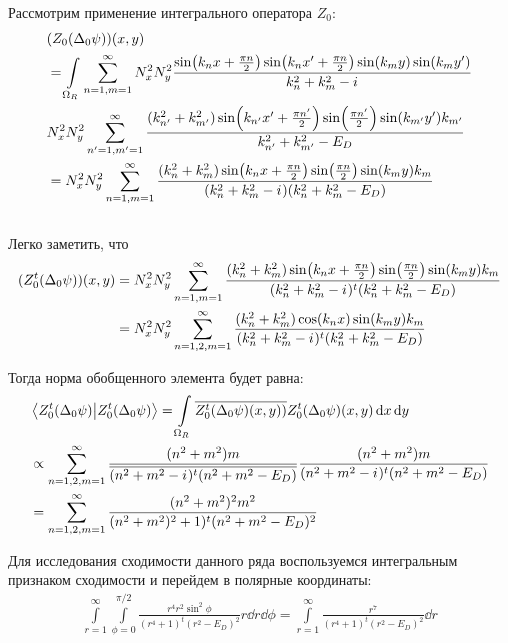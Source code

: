 Рассмотрим применение интегрального оператора $Z_0$:
\begin{align*}
& (Z_0 (\Delta_0 \psi))(x, y) \\
&= \int\limits_{\Omega_R} \sum\limits_{n = 1, m = 1}^\infty N_x^2 N_y^2 \frac{\sin(k_n x + \frac{\pi n}{2}) \sin(k_n x' + \frac{\pi n}{2}) \sin(k_m y) \sin(k_m y')}{k^2_n + k^2_m - {i\mkern1mu}} \\
& N_x^2 N_y^2 \sum\limits_{n' = 1, m' = 1}^\infty \frac{(k_{n'}^2 + k_{m'}^2) \sin(k_{n'} x' + \frac{\pi n'}{2}) \sin(\frac{\pi n'}{2}) \sin(k_{m'} y') k_{m'}}{k_{n'}^2 + k_{m'}^2 - E_D} \\
&= N_x^2 N_y^2 \sum\limits_{n = 1, m = 1}^\infty \frac{(k_n^2 + k_m^2) \sin(k_n x + \frac{\pi n}{2}) \sin(\frac{\pi n}{2}) \sin(k_m y) k_m}{(k_n^2 + k_m^2 - {i\mkern1mu}) (k_n^2 + k_m^2 - E_D)}
\end{align*}
\\ %
Легко заметить, что 
\begin{align*}
(Z_0^t (\Delta_0 \psi))(x, y)
&= N_x^2 N_y^2 \sum\limits_{n = 1, m = 1}^\infty \frac{(k_n^2 + k_m^2) \sin(k_n x + \frac{\pi n}{2}) \sin(\frac{\pi n}{2}) \sin(k_m y) k_m}{(k_n^2 + k_m^2 - {i\mkern1mu})^t (k_n^2 + k_m^2 - E_D)} \\
&= N_x^2 N_y^2 \sum\limits_{n = 1,2, m = 1}^\infty \frac{(k_n^2 + k_m^2) \cos(k_n x) \sin(k_m y) k_m}{(k_n^2 + k_m^2 - {i\mkern1mu})^t (k_n^2 + k_m^2 - E_D)}
\end{align*}

Тогда норма обобщенного элемента будет равна:
\begin{align*}
& \ip{Z_0^t (\Delta_0 \psi)}{Z_0^t (\Delta_0 \psi)} = \int\limits_{\Omega_R} \cconj{Z_0^t (\Delta_0 \psi)(x, y))} Z_0^t (\Delta_0 \psi)(x, y) \dd{x} \dd{y} \\
&\propto \sum\limits_{n = 1,2, m = 1}^\infty \frac{(n^2 + m^2) m}{\cconj{(n^2 + m^2 - \iu)^t (n^2 + m^2 - E_D)}} \frac{(n^2 + m^2) m}{(n^2 + m^2 - \iu)^t (n^2 + m^2 - E_D)} \\
&= \sum\limits_{n = 1,2, m = 1}^\infty \frac{(n^2 + m^2)^2 m^2}{(n^2 + m^2)^{2} + 1)^t (n^2 + m^2 - E_D)^2} 
\end{align*}

Для исследования сходимости данного ряда воспользуемся интегральным признаком сходимости и перейдем в полярные координаты:
\begin{align*}
\int\limits_{r = 1}^\infty \int\limits_{\phi = 0}^{\pi / 2} \frac{r^4 r^2 \sin^2 \phi}{(r^4 + 1)^t (r^2 - E_D)^2} r \dd{r} \dd{\phi}
= \int\limits_{r = 1}^\infty \frac{r^7}{(r^4 + 1)^t (r^2 - E_D)^2} \dd{r}
\end{align*}

